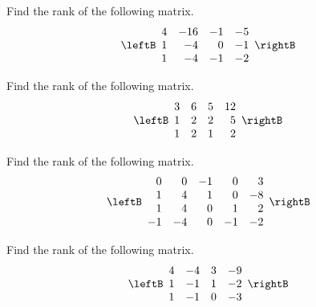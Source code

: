 \begin{enumialphparenastyle}

\begin{ex} Find the rank of the following matrix.
\begin{equation*}
\leftB
\begin{array}{rrrr}
4 & -16 & -1 & -5 \\
1 & -4 & 0 & -1 \\
1 & -4 & -1 & -2
\end{array}
\rightB
\end{equation*}
\end{ex}

\begin{ex} Find the rank of the following matrix.
\begin{equation*}
\leftB
\begin{array}{rrrr}
3 & 6 & 5 & 12 \\
1 & 2 & 2 & 5 \\
1 & 2 & 1 & 2
\end{array}
\rightB
\end{equation*}
\end{ex}

\begin{ex} Find the rank of the following matrix.
\begin{equation*}
\leftB
\begin{array}{rrrrr}
0 & 0 & -1 & 0 & 3 \\
1 & 4 & 1 & 0 & -8 \\
1 & 4 & 0 & 1 & 2 \\
-1 & -4 & 0 & -1 & -2
\end{array}
\rightB
\end{equation*}
\end{ex}

\begin{ex} Find the rank of the following matrix.
\begin{equation*}
\leftB
\begin{array}{rrrr}
4 & -4 & 3 & -9 \\
1 & -1 & 1 & -2 \\
1 & -1 & 0 & -3
\end{array}
\rightB
\end{equation*}
\end{ex}


\end{enumialphparenastyle}

